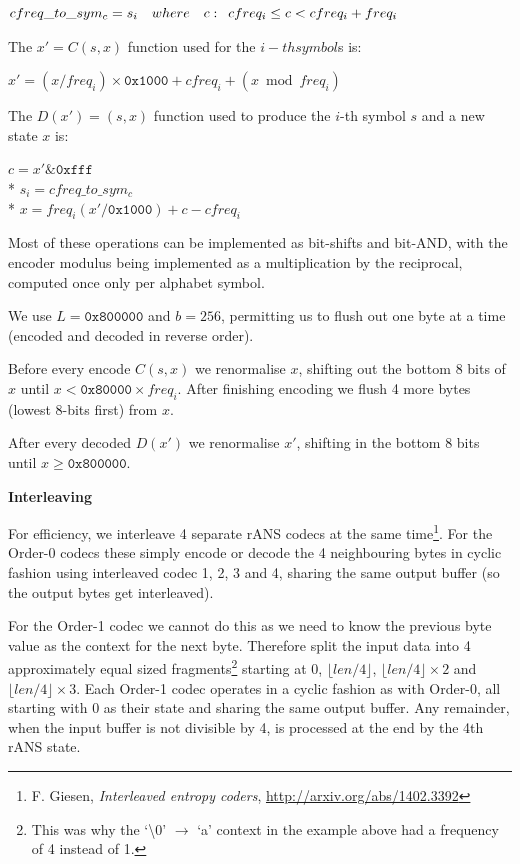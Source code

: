 \documentclass[a4paper]{article}
\begin{document}
{
\setlength{\parindent}{1cm}
\indent   $cfreq\_to\_sym_c = s_{i} \quad where \quad c: \enskip cfreq_i \leq c <
cfreq_i + freq_i$
}


The $x' = C(s,x)$ function used for the ${i}-th symbol ${s} is:

{
\setlength{\parindent}{1cm}
\indent    $x' = (x/freq_i) \times \mathtt{0x1000} + cfreq_i + (x \bmod freq_i)$
}

The $D(x') = (s,x)$ function used to produce the $i$-th symbol $s$ and
a new state $x$ is:

{
\setlength{\parindent}{1cm}
\indent    $c = x' \& \mathtt{0xfff}$\\*
\indent    $s_{i} = cfreq\_to\_sym_{c}$\\*
\indent    $x = freq_{i} (x' / \mathtt{0x1000}) + c - cfreq_{i}$
}

Most of these operations can be implemented as bit-shifts and bit-AND,
with the encoder modulus being implemented as a multiplication by the
reciprocal, computed once only per alphabet symbol.

We use $L = \mathtt{0x800000}$ and $b = 256$, permitting us to flush out one byte
at a time (encoded and decoded in reverse order).

Before every encode $C(s,x)$ we renormalise $x$, shifting out the bottom 8
bits of $x$ until $x < \mathtt{0x80000} \times freq_i$.  After finishing encoding we
flush 4 more bytes (lowest 8-bits first) from $x$.

After every decoded $D(x')$ we renormalise $x'$, shifting in the bottom 8
bits until $x \geq \mathtt{0x800000}$.


\textbf{Interleaving}

For efficiency, we interleave 4 separate rANS codecs at the same
time\footnote{F. Giesen, \textit{Interleaved entropy coders},
  \url{http://arxiv.org/abs/1402.3392}}.  For the Order-0 codecs these
simply encode or decode the 4 neighbouring bytes in cyclic fashion
using interleaved codec 1, 2, 3 and 4, sharing the same output buffer
(so the output bytes get interleaved).

For the Order-1 codec we cannot do this as we need to know the
previous byte value as the context for the next byte.  Therefore split
the input data into 4 approximately equal sized
fragments\footnote{This was why the `\textbackslash0' $\to$ `a'
  context in the example above had a frequency of 4 instead of 1.}
starting at $0$, $\lfloor{}len/4\rfloor{}$,
$\lfloor{}len/4\rfloor{}\times2$ and $\lfloor{}len/4\rfloor{}\times 3$.  Each
Order-1 codec operates in a cyclic fashion as with Order-0, all
starting with 0 as their state and sharing the same output buffer. Any
remainder, when the input buffer is not divisible by 4, is processed at
the end by the 4th rANS state.
\end{document}
